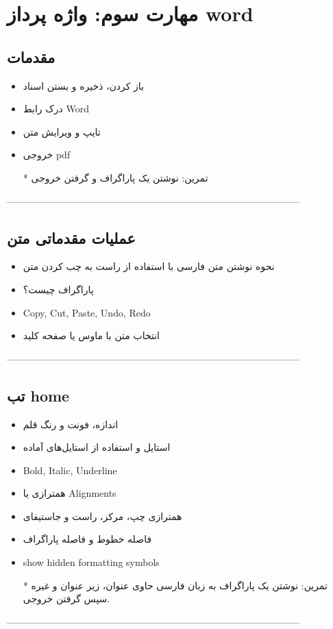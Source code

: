 \chapter{مهارت سوم: واژه پرداز word}

\section{مقدمات}
\begin{itemize}
\item
باز کردن، ذخیره و بستن اسناد
\item
درک رابط Word
\item
تایپ و ویرایش متن
\item
خروجی pdf
\item[*]
تمرین: نوشتن یک پاراگراف و گرفتن خروجی

\end{itemize}
--------------------------------------------------------------------------------------------
\section{عملیات مقدماتی متن}
\begin{itemize}
\item
نحوه نوشتن متن فارسی با استفاده از راست به چب کردن متن
\item
پاراگراف چیست؟
\item
Copy, Cut, Paste, Undo, Redo
\item
انتخاب متن با ماوس یا صفحه کلید
\end{itemize}
--------------------------------------------------------------------------------------------
\section{تب home}
\begin{itemize}
\item
اندازه، فونت و رنگ قلم
\item
استایل و استفاده از استایل‌های آماده
\item
Bold, Italic, Underline
\item
همترازی یا Alignments
\item
همترازی چپ، مرکز، راست و جاستیفای
\item
فاصله خطوط و فاصله پاراگراف
\item
show hidden formatting symbols
\item[*]
تمرین: نوشتن یک پاراگراف به زبان فارسی حاوی عنوان، زیر عنوان و غیره سپس گرفتن خروجی.
\end{itemize}
--------------------------------------------------------------------------------------------
